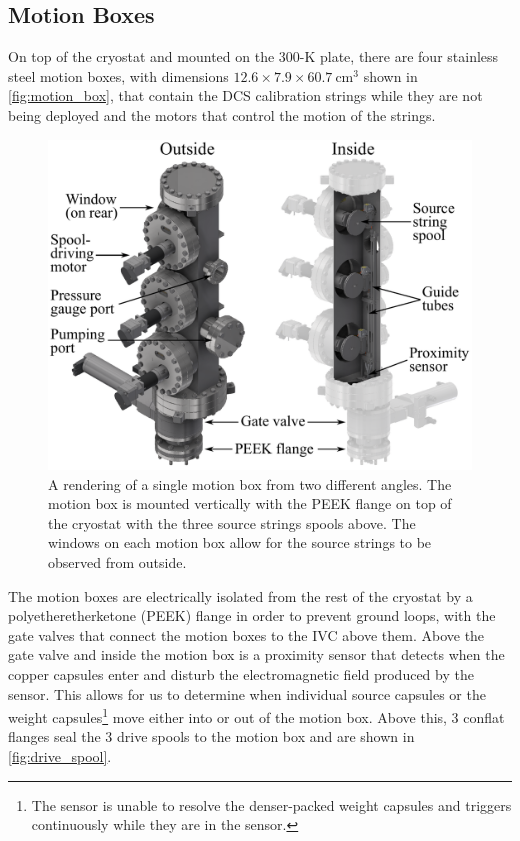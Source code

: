 \subsection*{Motion Boxes}
On top of the cryostat and mounted on the 300-K plate, there are four stainless steel motion boxes, with dimensions $12.6\times7.9\times60.7~\textrm{cm}^3$ shown in \autoref{fig:motion_box}, that contain the DCS calibration strings while they are not being deployed and the motors that control the motion of the strings.
\begin{figure}[htpb]
\includegraphics[width=0.9\linewidth]{Figures/motion_box.pdf}
\caption[A rendering of a single motion box from two different angles.]{A rendering of a single motion box from two different angles. The motion box is mounted vertically with the PEEK flange on top of the cryostat with the three source strings spools above. The windows on each motion box allow for the source strings to be observed from outside.}
\label{fig:motion_box}
\end{figure}
The motion boxes are electrically isolated from the rest of the cryostat by a polyetheretherketone (PEEK) flange in order to prevent ground loops, with the gate valves that connect the motion boxes to the IVC above them.
Above the gate valve and inside the motion box is a proximity sensor that detects when the copper capsules enter and disturb the electromagnetic field produced by the sensor.
This allows for us to determine when individual source capsules or the weight capsules\footnote{The sensor is unable to resolve the denser-packed weight capsules and triggers continuously while they are in the sensor.} move either into or out of the motion box.
Above this, 3 conflat flanges seal the 3 drive spools to the motion box and are shown in \autoref{fig:drive_spool}.
